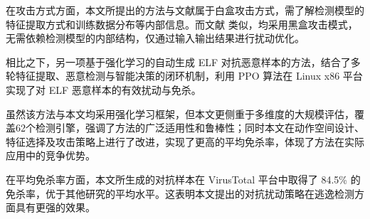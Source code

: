 \begin{conclusion}
在攻击方式方面，本文所提出的方法与文献\cite{rathore2021identification}属于白盒攻击方式，需了解检测模型的特征提取方式和训练数据分布等内部信息。而文献\cite{kolosnjaji2018adversarial,quertier2022merlin,song2022mab} 类似，均采用黑盒攻击模式，无需依赖检测模型的内部结构，仅通过输入输出结果进行扰动优化。


相比之下，另一项基于强化学习的自动生成 ELF 对抗恶意样本的方法\cite{xue2024reinforcement}，结合了多轮特征提取、恶意检测与智能决策的闭环机制，利用 PPO 算法在 Linux x86 平台实现了对 ELF 恶意样本的有效扰动与免杀。


虽然该方法与本文均采用强化学习框架，但本文更侧重于多维度的大规模评估，覆盖62个检测引擎，强调了方法的广泛适用性和鲁棒性；同时本文在动作空间设计、特征选择及攻击策略上进行了改进，实现了更高的平均免杀率，体现了方法在实际应用中的竞争优势。


在平均免杀率方面，本文所生成的对抗样本在 VirusTotal 平台中取得了 84.5\% 的免杀率，优于其他研究的平均水平。这表明本文提出的对抗扰动策略在逃逸检测方面具有更强的效果。

\end{conclusion}

